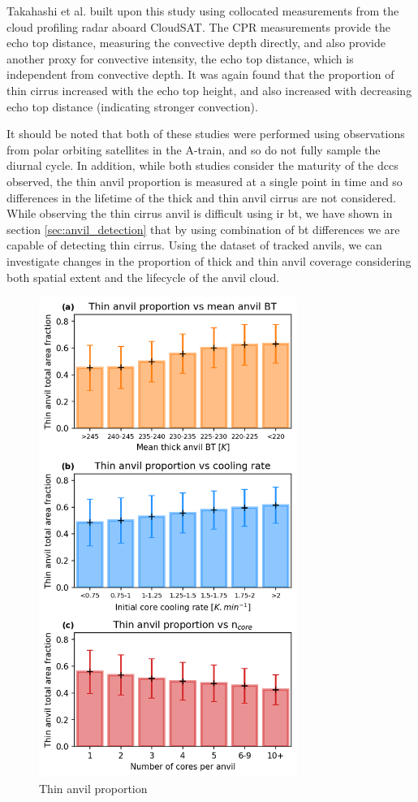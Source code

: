Takahashi et al. built upon this study using collocated measurements from the cloud profiling radar aboard CloudSAT.
The CPR measurements provide the echo top distance, measuring the convective depth directly, and also provide another proxy for convective intensity, the echo top distance, which is independent from convective depth.
It was again found that the proportion of thin cirrus increased with the echo top height, and also increased with decreasing echo top distance (indicating stronger convection).

It should be noted that both of these studies were performed using observations from polar orbiting satellites in the A-train, and so do not fully sample the diurnal cycle.
In addition, while both studies consider the maturity of the \acrshort{dcc}s observed, the thin anvil proportion is measured at a single point in time and so differences in the lifetime of the thick and thin anvil cirrus are not considered.
While observing the thin cirrus anvil is difficult using \acrshort{ir} \acrshort{bt}, we have shown in section \ref{sec:anvil_detection} that by using combination of \acrshort{bt} differences we are capable of detecting thin cirrus.
Using the dataset of tracked anvils, we can investigate changes in the proportion of thick and thin anvil coverage considering both spatial extent and the lifecycle of the anvil cloud.

\begin{figure}[tp]
    \centering
    \includegraphics[width=0.75\textwidth]{figures/ch2_20.png}
    \caption{Thin anvil proportion}
    \label{fig:thin_anvil_proportion}
\end{figure}


